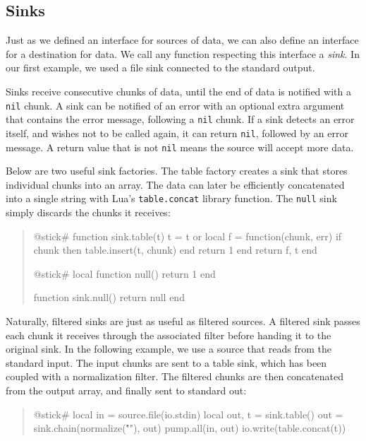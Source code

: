 \documentclass[10pt]{article}
\begin{document}
\subsection{Sinks}

Just as we defined an interface for sources of
data, we can also define an interface for a 
destination for data. We call any function respecting this
interface a \emph{sink}. In our first example, we used a
file sink connected to the standard output. 

Sinks receive consecutive chunks of data, until the end of
data is notified with a \texttt{nil} chunk. A sink can be
notified of an error with an optional extra argument that
contains the error message, following a \texttt{nil} chunk.  
If a sink detects an error itself, and
wishes not to be called again, it can return \texttt{nil},
followed by an error message. A return value that
is not \texttt{nil} means the source will accept more data.

Below are two useful sink factories. 
The table factory creates a sink that stores
individual chunks into an array. The data can later be
efficiently concatenated into a single string with Lua's
\texttt{table.concat} library function. The \texttt{null} sink 
simply discards the chunks it receives:
\begin{quote}
\begin{lua}
@stick#
function sink.table(t)
  t = t or {}
  local f = function(chunk, err)
    if chunk then table.insert(t, chunk) end
    return 1
  end
  return f, t
end
%

@stick#
local function null()
  return 1
end

function sink.null()
  return null
end
%
\end{lua}
\end{quote}

Naturally, filtered sinks are just as useful as filtered
sources. A filtered sink passes each chunk it receives
through the associated filter before handing it to the
original sink.  In the following example, we use a source
that reads from the standard input.  The input chunks are
sent to a table sink, which has been coupled with a
normalization filter.  The filtered chunks are then
concatenated from the output array, and finally sent to
standard out:
\begin{quote}
\begin{lua}
@stick#
local in = source.file(io.stdin)
local out, t = sink.table()
out = sink.chain(normalize("\r\n"), out)
pump.all(in, out)
io.write(table.concat(t))
%
\end{lua}
\end{quote}
\end{document}
